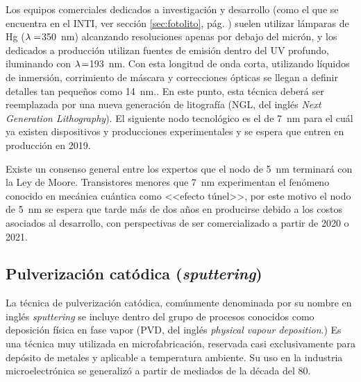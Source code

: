 		Los equipos comerciales dedicados a investigación y desarrollo (como el que se encuentra en el INTI, ver sección \ref{sec:fotolito}, pág. \pageref{sec:fotolito}) suelen utilizar lámparas de Hg ($\lambda\index{longitud de onda}=$\SI{350}{\nm}) alcanzando resoluciones apenas por debajo del micrón, y los dedicados a producción utilizan fuentes de emisión dentro del UV profundo, iluminando con $\lambda\index{longitud de onda}\!=$\SI{193}{\nm}. Con esta longitud de onda corta, utilizando líquidos de inmersión, corrimiento de máscara y correcciones ópticas se llegan a definir detalles tan pequeños como \SI{14}{\nm}.\cite{moore2006a}. En este punto, esta técnica deberá ser reemplazada por una nueva generación de litografía (NGL, del inglés \textit{Next Generation Lithography}).\cite{Asano2017,Schoot2017,Hasan2017,Naujok2017,Wan2017} El siguiente nodo tecnológico es el de \SI{7}{\nm} para el cuál ya existen dispositivos y producciones experimentales y se espera que entren en producción en 2019.\cite{Clinton2017,Chang2017}

		Existe un consenso general entre los expertos que el nodo de \SI{5}{\nm} terminará con la Ley de Moore. Transistores menores que \SI{7}{\nm} experimentan el fenómeno conocido en mecánica cuántica como <<efecto túnel>>, por este motivo el nodo de \SI{5}{\nm} se espera que tarde más de dos años en producirse debido a los costos asociados al desarrollo, con perspectivas de ser comercializado a partir de 2020 o 2021. \cite{samsungnewsroom,ibm2017}

	\subsection{Pulverización catódica (\textit{sputtering})}
				
		La técnica de pulverización catódica, comúnmente denominada por su nombre en inglés \textit{sputtering} se incluye dentro del grupo de procesos conocidos como deposición física en fase vapor (PVD, del inglés \textit{physical vapour deposition}.) Es una técnica muy utilizada en microfabricación, reservada casi exclusivamente para depósito de metales y aplicable a temperatura ambiente. Su uso en la industria microelectrónica se generalizó a partir de mediados de la década del 80.\cite{Depla2010,Kelly2000}


